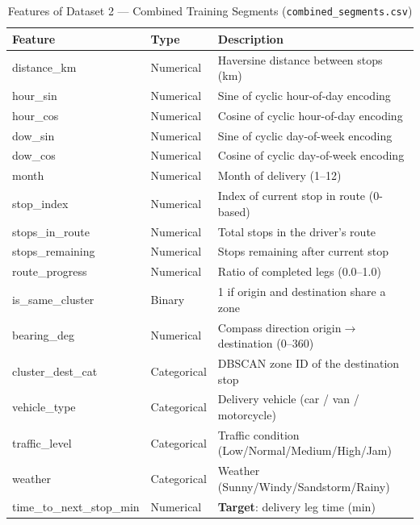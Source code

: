 \documentclass[conference]{IEEEtran}
\begin{document}
\begin{table}[H]
\caption{Features of Dataset 2 — Combined Training Segments
(\texttt{combined\_segments.csv})}
\centering
\begin{tabular}{|l|l|p{3.8cm}|}
\hline
\textbf{Feature} & \textbf{Type} & \textbf{Description} \\ \hline
distance\_km         & Numerical   & Haversine distance between stops (km) \\ \hline
hour\_sin            & Numerical   & Sine of cyclic hour-of-day encoding \\ \hline
hour\_cos            & Numerical   & Cosine of cyclic hour-of-day encoding \\ \hline
dow\_sin             & Numerical   & Sine of cyclic day-of-week encoding \\ \hline
dow\_cos             & Numerical   & Cosine of cyclic day-of-week encoding \\ \hline
month                & Numerical   & Month of delivery (1--12) \\ \hline
stop\_index          & Numerical   & Index of current stop in route (0-based) \\ \hline
stops\_in\_route     & Numerical   & Total stops in the driver's route \\ \hline
stops\_remaining     & Numerical   & Stops remaining after current stop \\ \hline
route\_progress      & Numerical   & Ratio of completed legs (0.0--1.0) \\ \hline
is\_same\_cluster    & Binary      & 1 if origin and destination share a zone \\ \hline
bearing\_deg         & Numerical   & Compass direction origin$\to$destination (0--360\textdegree{}) \\ \hline
cluster\_dest\_cat   & Categorical & DBSCAN zone ID of the destination stop \\ \hline
vehicle\_type        & Categorical & Delivery vehicle (car / van / motorcycle) \\ \hline
traffic\_level       & Categorical & Traffic condition (Low/Normal/Medium/High/Jam) \\ \hline
weather              & Categorical & Weather (Sunny/Windy/Sandstorm/Rainy) \\ \hline
time\_to\_next\_stop\_min & Numerical & \textbf{Target}: delivery leg time (min) \\ \hline
\end{tabular}
\end{table}
\end{document}
